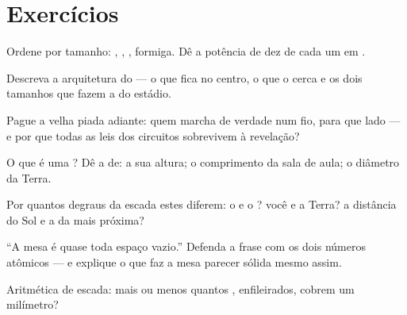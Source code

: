 \section{Exercícios}

\begin{exercise}[$\star$]\label{exo:g9:atoms-to-galaxies:1}
Ordene por tamanho: , , , formiga. Dê a potência
de dez de cada um em .
\end{exercise}

\begin{exercise}[$\star$]\label{exo:g9:atoms-to-galaxies:2}
Descreva a arquitetura do  --- o que fica no centro, o que o
cerca e os dois tamanhos que fazem a  do estádio.
\end{exercise}

\begin{exercise}[$\star$]\label{exo:g9:atoms-to-galaxies:3}
Pague a velha piada adiante: quem marcha de verdade num fio, para que
lado --- e por que todas as leis dos circuitos sobrevivem à
revelação?
\end{exercise}

\begin{exercise}[$\star$]\label{exo:g9:atoms-to-galaxies:4}
O que é uma ? Dê a  de: a sua
altura; o comprimento da sala de aula; o diâmetro da Terra.
\end{exercise}

\begin{exercise}[$\star$]\label{exo:g9:atoms-to-galaxies:5}
Por quantos degraus da escada estes diferem: o  e o ? você
e a Terra? a distância do Sol e a da  mais próxima?
\end{exercise}

\begin{exercise}[$\star$]\label{exo:g9:atoms-to-galaxies:6}
``A mesa é quase toda espaço vazio.'' Defenda a frase com os dois
números atômicos --- e explique o que faz a mesa parecer sólida mesmo
assim.
\end{exercise}

\begin{exercise}[$\star$]\label{exo:g9:atoms-to-galaxies:7}
Aritmética de escada: mais ou menos quantos , enfileirados,
cobrem um milímetro?
\end{exercise}

